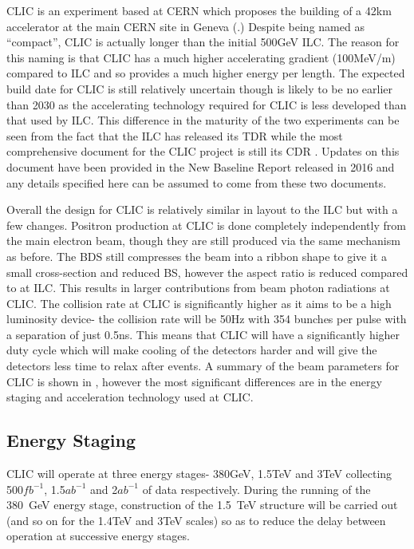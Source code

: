 \ac{CLIC} is an experiment based at CERN which proposes the building of a 42km accelerator at the main CERN site in Geneva (.) Despite being named as “compact”, \ac{CLIC} is actually longer than the initial 500GeV \ac{ILC}. The reason for this naming is that \ac{CLIC} has a much higher accelerating gradient (100MeV/m) compared to ILC and so provides a much higher energy per length. The expected build date for \ac{CLIC} is still relatively uncertain though is likely to be no earlier than 2030 as the accelerating technology required for \ac{CLIC} is less developed than that used by \ac{ILC}. This difference in the maturity of the two experiments can be seen from the fact that the \ac{ILC} has released its \ac{TDR} while the most comprehensive document for the CLIC project is still its \ac{CDR} \cite{CDR}. Updates on this document have been provided in the New Baseline Report \cite{UpdatedCLICBaseline} released in 2016 and any details specified here can be assumed to come from these two documents. 

Overall the design for \ac{CLIC} is relatively similar in layout to the \ac{ILC} but with a few changes. Positron production at \ac{CLIC} is done completely independently from the main electron beam, though they are still produced via the same mechanism as before. The \ac{BDS} still compresses the beam into a ribbon shape to give it a small cross-section and reduced \ac{BS}, however the aspect ratio is reduced compared to at \ac{ILC}. This results in larger contributions from beam photon radiations at \ac{CLIC}. The collision rate at \ac{CLIC} is significantly higher as it aims to be a high luminosity device- the collision rate will be 50Hz with 354 bunches per pulse with a separation of just 0.5ns. This means that CLIC will have a significantly higher duty cycle which will make cooling of the detectors harder and will give the detectors less time to relax after events. A summary of the beam parameters for CLIC is shown in , however the most significant differences are in the energy staging and acceleration technology used at \ac{CLIC}.

\subsection{Energy Staging}

CLIC will operate at three energy stages- 380GeV, 1.5TeV and 3TeV collecting 500${fb^{-1}}$, 1.5${ab^{-1}}$ and 2${ab^{-1}}$ of data respectively. During the running of the 380~GeV energy stage, construction of the 1.5~TeV structure will be carried out (and so on for the 1.4TeV and 3TeV scales) so as to reduce the delay between operation at successive energy stages. 

